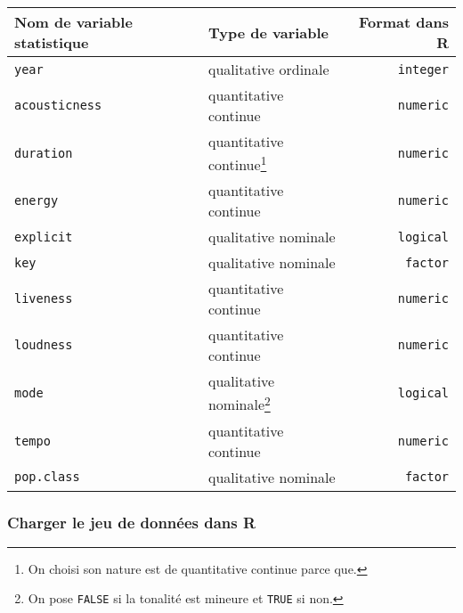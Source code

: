 \documentclass[
  12pt,
]{article}
\begin{document}
\begin{longtable}[]{@{}llr@{}}
\toprule
Nom de variable statistique & Type de variable & Format dans R \\
\midrule
\endhead
\texttt{year} & qualitative ordinale & \texttt{integer} \\
\texttt{acousticness} & quantitative continue & \texttt{numeric} \\
\texttt{duration} & quantitative continue\footnote{On choisi son nature
  est de quantitative continue parce que.} & \texttt{numeric} \\
\texttt{energy} & quantitative continue & \texttt{numeric} \\
\texttt{explicit} & qualitative nominale & \texttt{logical} \\
\texttt{key} & qualitative nominale & \texttt{factor} \\
\texttt{liveness} & quantitative continue & \texttt{numeric} \\
\texttt{loudness} & quantitative continue & \texttt{numeric} \\
\texttt{mode} & qualitative nominale\footnote{On pose \texttt{FALSE} si
  la tonalité est mineure et \texttt{TRUE} si non.} &
\texttt{logical} \\
\texttt{tempo} & quantitative continue & \texttt{numeric} \\
\texttt{pop.class} & qualitative nominale & \texttt{factor} \\
\bottomrule
\end{longtable}

\hypertarget{charger-le-jeu-de-donnuxe9es-dans-r}{%
\subsubsection{Charger le jeu de données dans
R}\label{charger-le-jeu-de-donnuxe9es-dans-r}}
\end{document}
